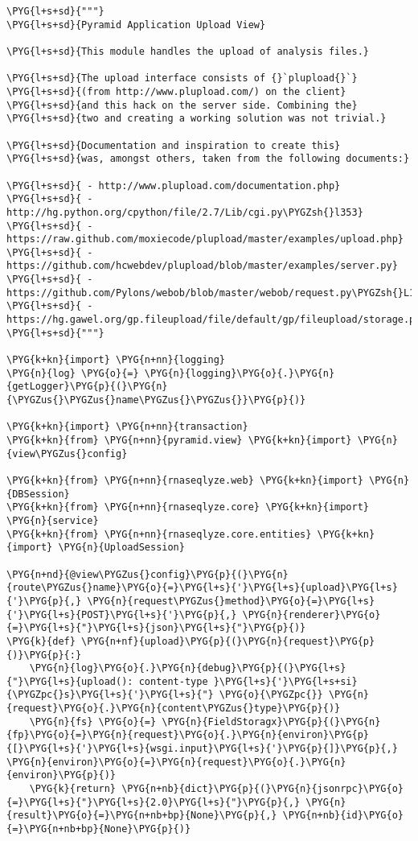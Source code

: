 \begin{Verbatim}[commandchars=\\\{\}]
\PYG{l+s+sd}{"""}
\PYG{l+s+sd}{Pyramid Application Upload View}

\PYG{l+s+sd}{This module handles the upload of analysis files.}

\PYG{l+s+sd}{The upload interface consists of {}`plupload{}`}
\PYG{l+s+sd}{(from http://www.plupload.com/) on the client}
\PYG{l+s+sd}{and this hack on the server side. Combining the}
\PYG{l+s+sd}{two and creating a working solution was not trivial.}

\PYG{l+s+sd}{Documentation and inspiration to create this}
\PYG{l+s+sd}{was, amongst others, taken from the following documents:}

\PYG{l+s+sd}{ - http://www.plupload.com/documentation.php}
\PYG{l+s+sd}{ - http://hg.python.org/cpython/file/2.7/Lib/cgi.py\PYGZsh{}l353}
\PYG{l+s+sd}{ - https://raw.github.com/moxiecode/plupload/master/examples/upload.php}
\PYG{l+s+sd}{ - https://github.com/hcwebdev/plupload/blob/master/examples/server.py}
\PYG{l+s+sd}{ - https://github.com/Pylons/webob/blob/master/webob/request.py\PYGZsh{}L102}
\PYG{l+s+sd}{ - https://hg.gawel.org/gp.fileupload/file/default/gp/fileupload/storage.py\PYGZsh{}l97}
\PYG{l+s+sd}{"""}

\PYG{k+kn}{import} \PYG{n+nn}{logging}
\PYG{n}{log} \PYG{o}{=} \PYG{n}{logging}\PYG{o}{.}\PYG{n}{getLogger}\PYG{p}{(}\PYG{n}{\PYGZus{}\PYGZus{}name\PYGZus{}\PYGZus{}}\PYG{p}{)}

\PYG{k+kn}{import} \PYG{n+nn}{transaction}
\PYG{k+kn}{from} \PYG{n+nn}{pyramid.view} \PYG{k+kn}{import} \PYG{n}{view\PYGZus{}config}

\PYG{k+kn}{from} \PYG{n+nn}{rnaseqlyze.web} \PYG{k+kn}{import} \PYG{n}{DBSession}
\PYG{k+kn}{from} \PYG{n+nn}{rnaseqlyze.core} \PYG{k+kn}{import} \PYG{n}{service}
\PYG{k+kn}{from} \PYG{n+nn}{rnaseqlyze.core.entities} \PYG{k+kn}{import} \PYG{n}{UploadSession}

\PYG{n+nd}{@view\PYGZus{}config}\PYG{p}{(}\PYG{n}{route\PYGZus{}name}\PYG{o}{=}\PYG{l+s}{'}\PYG{l+s}{upload}\PYG{l+s}{'}\PYG{p}{,} \PYG{n}{request\PYGZus{}method}\PYG{o}{=}\PYG{l+s}{'}\PYG{l+s}{POST}\PYG{l+s}{'}\PYG{p}{,} \PYG{n}{renderer}\PYG{o}{=}\PYG{l+s}{"}\PYG{l+s}{json}\PYG{l+s}{"}\PYG{p}{)}
\PYG{k}{def} \PYG{n+nf}{upload}\PYG{p}{(}\PYG{n}{request}\PYG{p}{)}\PYG{p}{:}
    \PYG{n}{log}\PYG{o}{.}\PYG{n}{debug}\PYG{p}{(}\PYG{l+s}{"}\PYG{l+s}{upload(): content-type }\PYG{l+s}{'}\PYG{l+s+si}{\PYGZpc{}s}\PYG{l+s}{'}\PYG{l+s}{"} \PYG{o}{\PYGZpc{}} \PYG{n}{request}\PYG{o}{.}\PYG{n}{content\PYGZus{}type}\PYG{p}{)}
    \PYG{n}{fs} \PYG{o}{=} \PYG{n}{FieldStoragx}\PYG{p}{(}\PYG{n}{fp}\PYG{o}{=}\PYG{n}{request}\PYG{o}{.}\PYG{n}{environ}\PYG{p}{[}\PYG{l+s}{'}\PYG{l+s}{wsgi.input}\PYG{l+s}{'}\PYG{p}{]}\PYG{p}{,} \PYG{n}{environ}\PYG{o}{=}\PYG{n}{request}\PYG{o}{.}\PYG{n}{environ}\PYG{p}{)}
    \PYG{k}{return} \PYG{n+nb}{dict}\PYG{p}{(}\PYG{n}{jsonrpc}\PYG{o}{=}\PYG{l+s}{"}\PYG{l+s}{2.0}\PYG{l+s}{"}\PYG{p}{,} \PYG{n}{result}\PYG{o}{=}\PYG{n+nb+bp}{None}\PYG{p}{,} \PYG{n+nb}{id}\PYG{o}{=}\PYG{n+nb+bp}{None}\PYG{p}{)}


\end{Verbatim}

